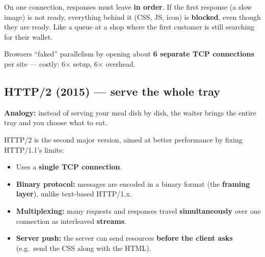 \begin{keyidea}
On one connection, responses must leave \textbf{in order}. If the first response (a slow image) is not ready, everything behind it (CSS, JS, icon) is \textbf{blocked}, even though they are ready. Like a queue at a shop where the first customer is still searching for their wallet.
\end{keyidea}

\begin{center}
\end{center}
Browsers ``faked'' parallelism by opening about \textbf{6 separate TCP connections} per site --- costly: 6$\times$ setup, 6$\times$ overhead.

\subsection{HTTP/2 (2015) --- serve the whole tray}
\textbf{Analogy:} instead of serving your meal dish by dish, the waiter brings the entire tray and you choose what to eat.

HTTP/2 is the second major version, aimed at better performance by fixing HTTP/1.1's limits:
\begin{itemize}
  \item Uses a \textbf{single TCP connection}.
  \item \textbf{Binary protocol:} messages are encoded in a binary format (the \textbf{framing layer}), unlike text-based HTTP/1.x.
  \item \textbf{Multiplexing:} many requests and responses travel \textbf{simultaneously} over one connection as interleaved \textbf{streams}.
  \item \textbf{Server push:} the server can send resources \textbf{before the client asks} (e.g.\ send the CSS along with the HTML).
\end{itemize}

